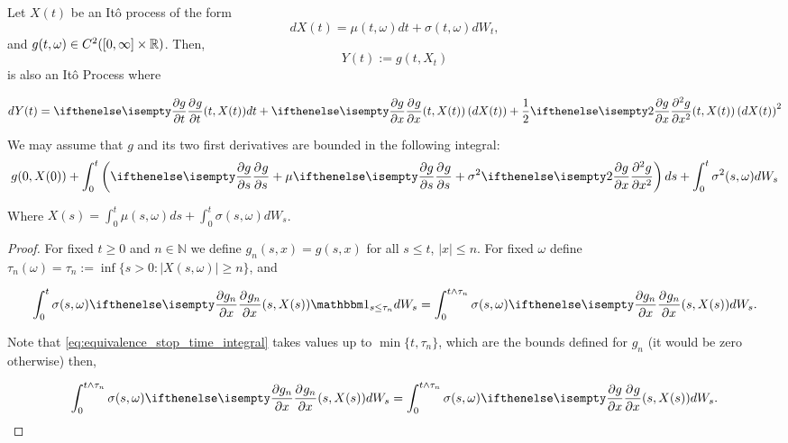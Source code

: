 \documentclass[../TGMAFFIRO.tex]{subfiles}
\begin{document}
\begin{theorem}\label{th:itos_formula}
	Let $X(t)$ be an It\^o process of the form
	\[
		dX(t) = \mu(t, \omega) dt + \sigma(t, \omega) dW_t,
	\]
	and $g(t, \omega) \in C^2([0, \infty]\times\mathbb{R})$. Then,
	\begin{equation}
		Y(t) := g(t, X_t)
	\end{equation}
	is also an It\^o Process where
	
	\begin{equation}\label{eq:itos_formula}
		dY(t) = \partialwrt{g}{t}(t, X(t)) dt + \partialwrt{g}{x}(t, X(t)) \left(dX(t)\right) + \frac{1}{2}\partialwrt[2]{g}{x} (t, X(t)) \left(dX(t)\right)^2
	\end{equation}	
\end{theorem}

\begin{proposition}\label{prop:on_bounded_ito_g}
We may assume that $g$ and its two first derivatives are bounded in the following integral:
\begin{equation}\label{eq:g_bounded}
  g(0, X(0)) + \int_0^t \left(\partialwrt{g}{s} + \mu\partialwrt{g}{s} + \sigma^2\partialwrt[2]{g}{x}\right) ds + \int_0^t\sigma^2(s, \omega) dW_s
\end{equation}

Where $X(s) = \int_0^t \mu(s, \omega) ds + \int_0^t \sigma(s, \omega) dW_s$.

\begin{proof}
	For fixed $t\geq 0$ and $n\in\mathbb{N}$ we define $g_n(s, x) = g(s, x)$ for all $s \leq t$, $|x|\leq n$. For fixed $\omega$ define $\tau_n(\omega) = \tau_n := \inf\{s>0: |X(s,\omega)| \geq n\}$, and
	
	\begin{equation}\label{eq:equivalence_stop_time_integral}
		\int_0^{t} \sigma(s,\omega) \partialwrt{g_n}{x}(s, X(s)) \ind_{s\leq \tau_n} dW_s = \int_0^{t\wedge\tau_n} \sigma(s,\omega) \partialwrt{g_n}{x} (s, X(s)) dW_s.
	\end{equation}

Note that \ref{eq:equivalence_stop_time_integral} takes values up to $\min\{t, \tau_n\}$, which are the bounds defined for $g_n$ (it would be zero otherwise) then,

	\begin{equation}
	  \int_0^{t\wedge\tau_n} \sigma(s,\omega) \partialwrt{g_n}{x} (s, X(s)) dW_s = \int_0^{t\wedge\tau_n} \sigma(s,\omega) \partialwrt{g}{x} (s, X(s)) dW_s.
	\end{equation}
	


\end{proof}
\end{proposition}
\end{document}

